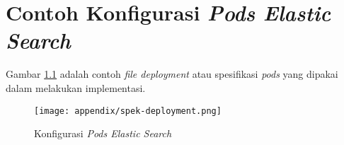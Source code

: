 \chapter{Contoh Konfigurasi \textit{Pods Elastic Search}}
\label{appendix:cth-konfigurasi-es-pods}
Gambar \ref{fig:appendix-spec-deployment} adalah contoh \textit{file deployment} atau spesifikasi \textit{pods} yang dipakai dalam melakukan implementasi.

\begin{figure}[h]
    \centering
    \texttt{[image: appendix/spek-deployment.png]}
    \caption{Konfigurasi \textit{Pods Elastic Search}}
    \label{fig:appendix-spec-deployment}
\end{figure}